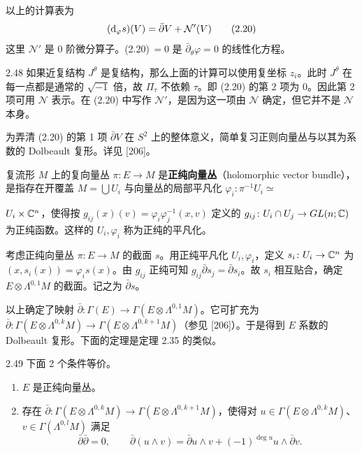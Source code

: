 以上的计算表为
\begin{equation}
  (\mathrm{d}_\varphi s)(V)=\bar\partial V+\mathcal{N}'(V) \tag{2.20}
\end{equation}
这里 $\mathcal{N}'$ 是 0 阶微分算子。(2.20)$\,=0$ 是 $\bar\partial_\theta\varphi=0$ 的线性化方程。

\begin{remark}{2.48}
  如果近复结构 $J^\theta$ 是复结构，那么上面的计算可以使用复坐标 $z_i$。此时 $J^\theta$ 在每一点都是通常的 $\sqrt{-1}$ 倍，故 $\Pi_\tau$ 不依赖 $\tau$。即 (2.20) 的第 2 项为 0。因此第 2 项可用 $\mathcal{N}$ 表示。在 (2.20) 中写作 $\mathcal{N}'$，是因为这一项由 $\mathcal{N}$ 确定，但它并不是 $\mathcal{N}$ 本身。
\end{remark}

为弄清 (2.20) 的第 1 项 $\bar\partial V$ 在 $S^2$ 上的整体意义，简单复习正则向量丛与以其为系数的 Dolbeault 复形。详见 [206]。

复流形 $M$ 上的复向量丛 $\pi\colon E\to M$ 是\textbf{正纯向量丛}（holomorphic vector bundle），是指存在开覆盖 $M=\bigcup U_i$ 与向量丛的局部平凡化 $\varphi_i\colon\pi^{-1}U_i\simeq$

$U_i\times\mathbb{C}^n$，使得按 $g_{ij}(x)(v)=\varphi_i\varphi_j^{-1}(x,v)$ 定义的 $g_{ij}\colon U_i\cap U_j\to GL(n;\mathbb{C})$ 为正纯函数。这样的 $U_i,\varphi_i$ 称为正纯的平凡化。

考虑正纯向量丛 $\pi\colon E\to M$ 的截面 $s$。用正纯平凡化 $U_i,\varphi_i$，定义 $s_i\colon U_i\to\mathbb{C}^n$ 为 $(x,s_i(x))=\varphi_is(x)$。由 $g_{ij}$ 正纯可知 $g_{ij}\bar\partial s_j=\bar\partial s_i$。故 $s_i$ 相互贴合，确定 $E\otimes\Lambda^{0,1}M$ 的截面。记之为 $\bar\partial s$。

以上确定了映射 $\bar\partial\colon\Gamma(E)\to\Gamma(E\otimes\Lambda^{0,1}M)$。它可扩充为 $\bar\partial\colon\Gamma(E\otimes\Lambda^{0,k}M)\to\Gamma(E\otimes\Lambda^{0,k+1}M)$（参见 [206]）。于是得到 $E$ 系数的 Dolbeault 复形。下面的定理是定理 2.35 的类似。

\begin{theorem}{2.49}
  下面 2 个条件等价。
  \begin{enumerate}[label=(\arabic*),leftmargin=2.2em,itemsep=1pt,topsep=2pt]
    \item $E$ 是正纯向量丛。
    \item 存在 $\bar\partial\colon\Gamma(E\otimes\Lambda^{0,k}M)\to\Gamma(E\otimes\Lambda^{0,k+1}M)$，使得对 $u\in\Gamma(E\otimes\Lambda^{0,k}M)$、$v\in\Gamma(\Lambda^{0,l}M)$ 满足
    \[
      \bar\partial\bar\partial=0,\qquad \bar\partial(u\wedge v)=\bar\partial u\wedge v+(-1)^{\deg u}u\wedge\bar\partial v.
    \]
  \end{enumerate}
\end{theorem}

